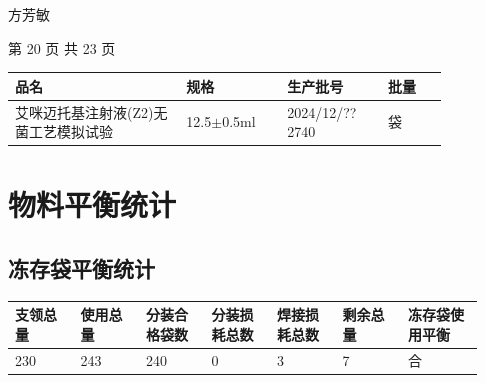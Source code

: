 \documentclass[UTF8,10pt,a4paper,fontset=fandol]{ctexart}
\newcommand{\fieldvalue}[1]{#1}
\newcommand{\handwritten}[1]{#1}
\begin{document}
\noindent\fieldvalue{\handwritten{方芳敏}}

\noindent\hfill 第 20 页 共 23 页

\newpage

\begin{center}
\begin{tabular}{|p{0.34\linewidth}|p{0.20\linewidth}|p{0.20\linewidth}|p{0.12\linewidth}|}
\hline
品名 & 规格 & 生产批号 & 批量 \\
\hline
艾咪迈托基注射液(Z2)无菌工艺模拟试验
&
12.5$\pm$0.5ml
&
\fieldvalue{\handwritten{2024/12/?? 2740}}
&
袋
\\
\hline
\end{tabular}
\end{center}

\section{物料平衡统计}

\subsection{冻存袋平衡统计}

\begin{center}
\small
\begin{tabular}{|p{0.13\linewidth}|p{0.13\linewidth}|p{0.13\linewidth}|p{0.13\linewidth}|p{0.13\linewidth}|p{0.13\linewidth}|p{0.15\linewidth}|}
\hline
支领总量 & 使用总量 & 分装合格袋数 & 分装损耗总数 & 焊接损耗总数 & 剩余总量 & 冻存袋使用平衡 \\
\hline
\fieldvalue{\handwritten{230}}
&
\fieldvalue{\handwritten{243}}
&
\fieldvalue{\handwritten{240}}
&
\fieldvalue{\handwritten{0}}
&
\fieldvalue{\handwritten{3}}
&
\fieldvalue{\handwritten{7}}
&
\fieldvalue{\handwritten{合}}
\\
\hline
\end{tabular}
\end{center}
\end{document}
